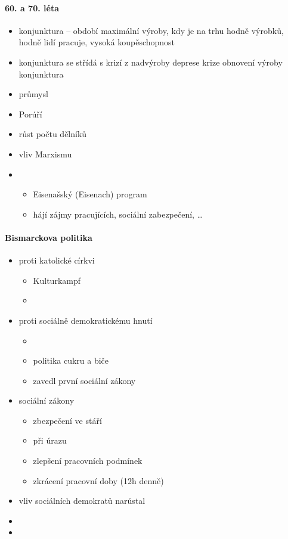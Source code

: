 \paragraph{60. a 70. léta}
\begin{itemize}
\item konjunktura -- období maximální výroby, kdy je na trhu hodně výrobků, hodně lidí pracuje, vysoká koupěschopnost
\item konjunktura se střídá s krizí z nadvýroby \ra deprese krize \ra obnovení výroby \ra konjunktura
\item průmysl
\item Porúří
\item růst počtu dělníků
\item vliv Marxismu
\item {}
	\begin{itemize}
	\item Eisenašský (Eisenach) program
	\item hájí zájmy pracujících, sociální zabezpečení, \ldots
	\end{itemize}	 
\end{itemize}

\paragraph{Bismarckova politika}
\begin{itemize}
\item proti katolické církvi
	\begin{itemize}
	\item Kulturkampf 
	\item {}
	\end{itemize}
\item proti sociálně demokratickému hnutí
	\begin{itemize}
	\item {}
	\item politika cukru a biče
	\item zavedl první sociální zákony
	\end{itemize}
\item sociální zákony
	\begin{itemize}
	\item zbezpečení ve stáří
	\item při úrazu
	\item zlepšení pracovních podmínek
	\item zkrácení pracovní doby (12h denně)
	\end{itemize}
\item vliv sociálních demokratů narůstal
\item {}
\item {}
\end{itemize}

